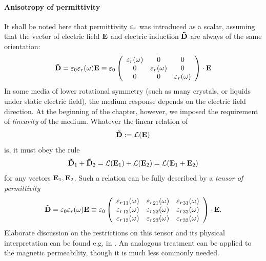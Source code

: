 \paragraph{Anisotropy of permittivity} \label{par_anisotropy} %
It shall be noted here that permittivity $\varepsilon_r$ was introduced as a scalar, assuming that the vector of electric field $\mathbf{E}$ and electric induction $\mathbf{\tilde{D}}$ are always of the same orientation:
\begin{equation} \mathbf{\tilde{D}} = \varepsilon_0 \varepsilon_r(\omega) \mathbf{E} \equiv \varepsilon_0  
	\left(\begin{array}{ccc} 
			\varepsilon_r(\omega) & 0 & 0  \\
			0 & \varepsilon_r(\omega) & 0  \\
			0 & 0 &\varepsilon_r(\omega)  
	\end{array} \right) \cdot \mathbf{E}
	\label{eq_}
\end{equation}
In some media of lower rotational symmetry (such as many crystals, or liquids under static electric field), the medium response depends on the electric field direction. At the beginning of the chapter, however, we imposed the requirement of \textit{linearity} of the medium. Whatever the linear relation of 
$$\mathbf{\tilde{D}} := \mathcal{L}(\mathbf{E})$$
is, it must obey the rule
$$\mathbf{\tilde{D}}_1 + \mathbf{\tilde{D}}_2 = \mathcal{L}(\mathbf{E}_1) + \mathcal{L}(\mathbf{E}_2) = \mathcal{L}(\mathbf{E}_1 + \mathbf{E}_2)$$
for any vectors $\mathbf{E}_1, \mathbf{E}_2$. Such a relation can be fully described by a \textit{tensor of permittivity} %
\begin{equation} \mathbf{\tilde{D}} = \varepsilon_0 \varepsilon_r(\omega) \mathbf{E} \equiv \varepsilon_0  
	\left(\begin{array}{ccc} 
	{\varepsilon_r}_{11}(\omega) & {\varepsilon_r}_{21}(\omega) & {\varepsilon_r}_{31}(\omega)  \\
	{\varepsilon_r}_{12}(\omega) & {\varepsilon_r}_{22}(\omega) & {\varepsilon_r}_{32}(\omega)  \\
	{\varepsilon_r}_{13}(\omega) & {\varepsilon_r}_{23}(\omega) & {\varepsilon_r}_{33}(\omega)  
	\end{array} \right) \cdot \mathbf{E}.
	\label{eq_}
\end{equation}
Elaborate discussion on the restrictions on this tensor and its physical interpretation can be found e.g. in \cite[pp. 678--686]{born1999book}. An analogous treatment can be applied to the magnetic permeability, though it is much less commonly needed.
